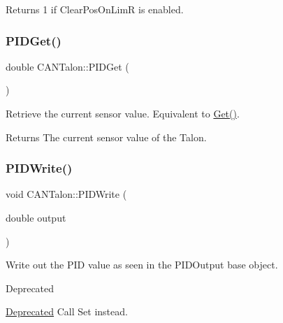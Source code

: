 \begin{DoxyReturn}{Returns}
\textquotesingle{}1\textquotesingle{} if Clear\+Pos\+On\+LimR is enabled. 
\end{DoxyReturn}
\mbox{\label{class_c_a_n_talon_affb8fef48a657c5a4d60ef5b76664091}} 
\subsubsection{\texorpdfstring{P\+I\+D\+Get()}{PIDGet()}}
{\footnotesize\ttfamily double C\+A\+N\+Talon\+::\+P\+I\+D\+Get (\begin{DoxyParamCaption}{ }\end{DoxyParamCaption})\hspace{0.3cm}{\ttfamily [override]}}

Retrieve the current sensor value. Equivalent to \hyperlink{class_c_a_n_talon_a6819f1eae4eefb39c441a3b8e973613d}{Get()}.

\begin{DoxyReturn}{Returns}
The current sensor value of the Talon. 
\end{DoxyReturn}
\mbox{\label{class_c_a_n_talon_a544ae037c202cb4e97c2ef8fd68b005b}} 
\subsubsection{\texorpdfstring{P\+I\+D\+Write()}{PIDWrite()}}
{\footnotesize\ttfamily void C\+A\+N\+Talon\+::\+P\+I\+D\+Write (\begin{DoxyParamCaption}\item[{double}]{output }\end{DoxyParamCaption})\hspace{0.3cm}{\ttfamily [override]}}

Write out the P\+ID value as seen in the P\+I\+D\+Output base object.

\begin{DoxyRefDesc}{Deprecated}
\item[\hyperlink{deprecated__deprecated000001}{Deprecated}]Call Set instead.\end{DoxyRefDesc}



